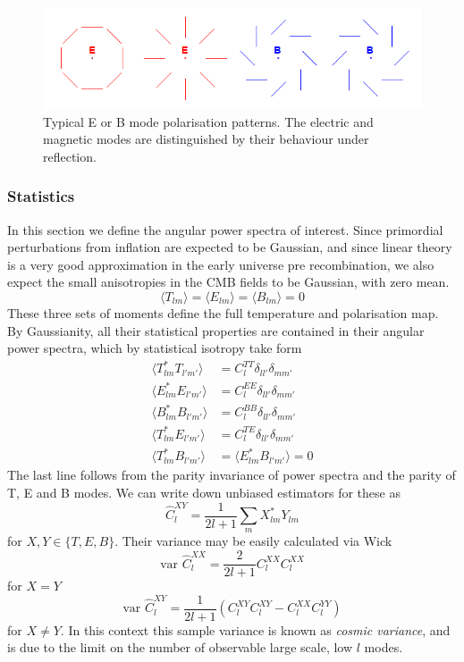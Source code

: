 \documentclass[a4paper,10pt]{article}
\begin{document}
\begin{figure}[h]
  \includegraphics[width=\linewidth]{EBpicture.png}
  \caption{Typical E or B mode polarisation patterns. The electric and magnetic modes are distinguished by their behaviour under reflection.}
\end{figure}

\subsubsection{Statistics}

In this section we define the angular power spectra of interest. Since primordial perturbations from inflation are expected to be Gaussian, and since linear theory is a very good approximation in the early universe pre recombination, we also expect the small anisotropies in the CMB fields to be Gaussian, with zero mean. 
\begin{equation}
\langle T_{lm} \rangle = \langle E_{lm} \rangle = \langle B_{lm} \rangle = 0
\end{equation}
These three sets of moments define the full temperature and polarisation map. By Gaussianity, all their statistical properties are contained in their angular power spectra, which by statistical isotropy take form
\begin{equation}\begin{split}
\langle T_{lm}^*T_{l'm'} \rangle &= C^{TT}_l\delta_{ll'}\delta_{mm'}\\
\langle E_{lm}^*E_{l'm'} \rangle &= C^{EE}_l\delta_{ll'}\delta_{mm'}\\
\langle B_{lm}^*B_{l'm'} \rangle &= C^{BB}_l\delta_{ll'}\delta_{mm'}\\
\langle T_{lm}^*E_{l'm'} \rangle &= C^{TE}_l\delta_{ll'}\delta_{mm'}\\
\langle T_{lm}^*B_{l'm'} \rangle &= \langle E_{lm}^*B_{l'm'} \rangle = 0
\label{powerspectra}
\end{split}\end{equation}
The last line follows from the parity invariance of power spectra and the parity of T, E and B modes. We can write down unbiased estimators for these as
\begin{equation}
\hat{C}_l^{XY} = \frac{1}{2l+1}\sum_m X_{lm}^*Y_{lm}
\end{equation}
for $X,Y \in \{T,E,B\}$. Their variance may be easily calculated via Wick
\begin{equation}
\text{var }\hat{C}_l^{XX}=\frac{2}{2l+1}C_l^{XX}C_l^{XX}
\end{equation}
for $X=Y$
\begin{equation}
\text{var }\hat{C}_l^{XY}=\frac{1}{2l+1}(C_l^{XY}C_l^{XY}-C_l^{XX}C_l^{YY})
\end{equation}
for $X\neq Y$. In this context this sample variance is known as \textit{cosmic variance}, and is due to the limit on the number of observable large scale, low $l$ modes.
\end{document}
